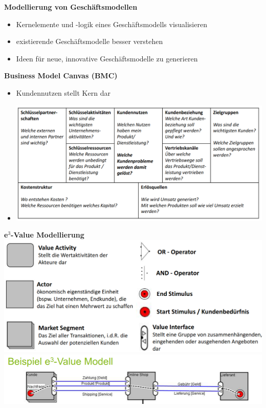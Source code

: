 \documentclass[a4]{scrartcl}
\begin{document}
\newpage

\textbf{Modellierung von Geschäftsmodellen}

\begin{itemize}
\item Kernelemente und -logik eines Geschäftsmodells visualisieren
\item existierende Geschäftsmodelle besser verstehen
\item Ideen für neue, innovative Geschäftsmodelle zu generieren
\end{itemize}

\textbf{Business Model Canvas (BMC)}

\begin{itemize}
\item Kundennutzen stellt Kern dar
\item \includegraphics[scale=0.4]{BMC.png}
\end{itemize}


\textbf{e$^3$-Value Modellierung} \\
\includegraphics[scale=0.4]{modelldings.png} \\
\includegraphics[scale=0.4]{beispiel_e3.png}
\end{document}
